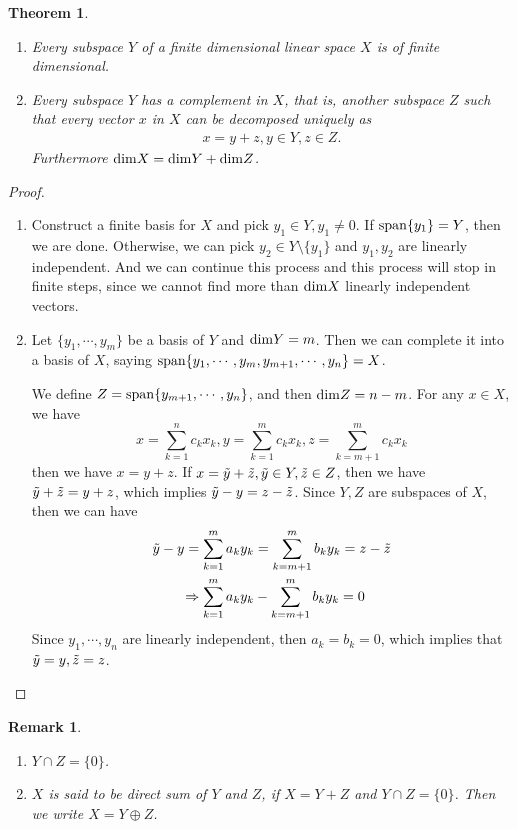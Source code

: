 \documentclass[11pt]{book}
\newtheorem{theorem}{Theorem}[section]
\newtheorem{remark}{Remark}[section]
\theoremstyle{definition}
\numberwithin{equation}{chapter}
\begin{document}
\medskip

\begin{theorem}
~\begin{enumerate}[label=(\alph*)]
    \item Every subspace $Y$ of a finite dimensional linear space $X$ is of finite dimensional.
    \item Every subspace $Y$ has a complement in $X$, that is, another subspace $Z$ such that every vector $x$ in $X$ can be decomposed uniquely as
    \begin{align*}
        x = y + z, y\in Y, z\in Z.
    \end{align*}
    Furthermore ${\rm dim}X = {\rm dim}Y + {\rm dim}Z$.
\end{enumerate}
\end{theorem}
\begin{proof}
~\begin{enumerate}[label=(\alph*)]
    \item Construct a finite basis for $X$ and pick $y_1\in Y, y_1\neq 0$. If ${\rm span}\{y_1\} = Y$, then we are done. Otherwise, we can pick $y_2\in Y\setminus\{y_1\}$ and $y_1, y_2$ are linearly independent. And we can continue this process and this process will stop in finite steps, since we cannot find more than ${\rm dim}X$ linearly independent vectors. 
    \item Let $\{y_1, \cdots, y_m\}$ be a basis of $Y$ and ${\rm dim}Y = m$. Then we can complete it into a basis of $X$, saying ${\rm span}\{y_1, \cdots, y_m, y_{m+1},\cdots, y_n\} = X$. 
    
    We define $Z = {\rm span}\{y_{m+1},\cdots, y_n\}$, and then ${\rm dim}Z = n - m$. For any $x\in X$, we have 
    $$x = \sum^n_{k=1}c_k x_k, y = \sum^m_{k=1}c_k x_k, z = \sum^m_{k=m+1}c_k x_k$$ 
    then we have $x = y+z$. If $x = \Tilde{y} + \Tilde{z}, \Tilde{y}\in Y, \Tilde{z}\in Z$, then we have $\Tilde{y} + \Tilde{z} = y + z$, which implies $\Tilde{y} - y = z - \Tilde{z}$. Since $Y,Z$ are subspaces of $X$, then we can have 
    \begin{align*}
        \Tilde{y} - y = \sum^m_{k=1}a_ky_k & = \sum^m_{k=m+1}b_ky_k = z - \Tilde{z} \\
        \Rightarrow \sum^m_{k=1}a_ky_k & - \sum^m_{k=m+1}b_ky_k = 0
    \end{align*}
    Since $y_1,\cdots, y_n$ are linearly independent, then $a_k = b_k = 0$, which implies that $\Tilde{y}=y, \Tilde{z}=z$.
\end{enumerate}
\end{proof}
\begin{remark}
~\begin{enumerate}[label=(\arabic*)]
    \item $Y\cap Z = \{0\}$.
    \item $X$ is said to be direct sum of $Y$ and $Z$, if $X = Y+Z$ and $Y\cap Z = \{0\}$. Then we write $X = Y \oplus Z$.
\end{enumerate}
\end{remark}
\end{document}

